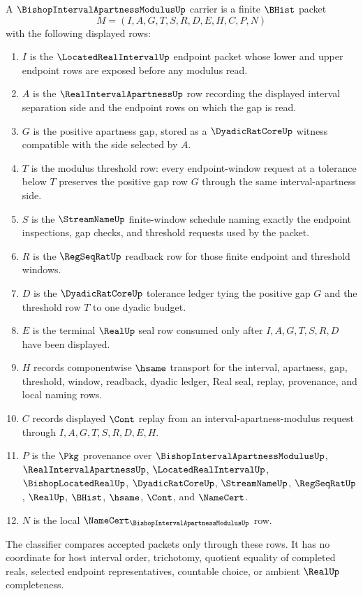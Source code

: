 \begin{definition}
\label{def:bishop-interval-apartness-modulus-carrier}
A $\BishopIntervalApartnessModulusUp$ carrier is a finite $\BHist$ packet
$$
M=(I,A,G,T,S,R,D,E,H,C,P,N)
$$
with the following displayed rows:
\begin{enumerate}
\item $I$ is the $\LocatedRealIntervalUp$ endpoint packet whose lower and upper endpoint rows are exposed before any modulus read.
\item $A$ is the $\RealIntervalApartnessUp$ row recording the displayed interval separation side and the endpoint rows on which the gap is read.
\item $G$ is the positive apartness gap, stored as a $\DyadicRatCoreUp$ witness compatible with the side selected by $A$.
\item $T$ is the modulus threshold row: every endpoint-window request at a tolerance below $T$ preserves the positive gap row $G$ through the same interval-apartness side.
\item $S$ is the $\StreamNameUp$ finite-window schedule naming exactly the endpoint inspections, gap checks, and threshold requests used by the packet.
\item $R$ is the $\RegSeqRatUp$ readback row for those finite endpoint and threshold windows.
\item $D$ is the $\DyadicRatCoreUp$ tolerance ledger tying the positive gap $G$ and the threshold row $T$ to one dyadic budget.
\item $E$ is the terminal $\RealUp$ seal row consumed only after $I,A,G,T,S,R,D$ have been displayed.
\item $H$ records componentwise $\hsame$ transport for the interval, apartness, gap, threshold, window, readback, dyadic ledger, Real seal, replay, provenance, and local naming rows.
\item $C$ records displayed $\Cont$ replay from an interval-apartness-modulus request through $I,A,G,T,S,R,D,E,H$.
\item $P$ is the $\Pkg$ provenance over $\BishopIntervalApartnessModulusUp$, $\RealIntervalApartnessUp$, $\LocatedRealIntervalUp$, $\BishopLocatedRealUp$, $\DyadicRatCoreUp$, $\StreamNameUp$, $\RegSeqRatUp$, $\RealUp$, $\BHist$, $\hsame$, $\Cont$, and $\NameCert$.
\item $N$ is the local $\NameCert_{\BishopIntervalApartnessModulusUp}$ row.
\end{enumerate}
The classifier compares accepted packets only through these rows. It has no coordinate for host interval order, trichotomy, quotient equality of completed reals, selected endpoint representatives, countable choice, or ambient $\RealUp$ completeness.
\end{definition}

